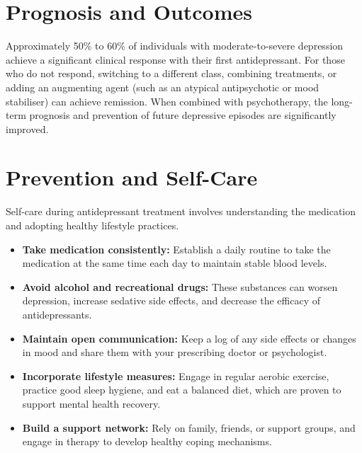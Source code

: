 \section*{Prognosis and Outcomes}
Approximately 50\% to 60\% of individuals with moderate-to-severe depression achieve a significant clinical response with their first antidepressant. For those who do not respond, switching to a different class, combining treatments, or adding an augmenting agent (such as an atypical antipsychotic or mood stabiliser) can achieve remission. When combined with psychotherapy, the long-term prognosis and prevention of future depressive episodes are significantly improved.

\section*{Prevention and Self-Care}
Self-care during antidepressant treatment involves understanding the medication and adopting healthy lifestyle practices.
\begin{itemize}
    \item \textbf{Take medication consistently:} Establish a daily routine to take the medication at the same time each day to maintain stable blood levels.
    \item \textbf{Avoid alcohol and recreational drugs:} These substances can worsen depression, increase sedative side effects, and decrease the efficacy of antidepressants.
    \item \textbf{Maintain open communication:} Keep a log of any side effects or changes in mood and share them with your prescribing doctor or psychologist.
    \item \textbf{Incorporate lifestyle measures:} Engage in regular aerobic exercise, practice good sleep hygiene, and eat a balanced diet, which are proven to support mental health recovery.
    \item \textbf{Build a support network:} Rely on family, friends, or support groups, and engage in therapy to develop healthy coping mechanisms.
\end{itemize}


